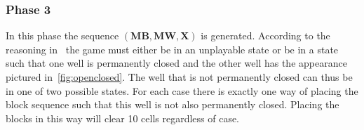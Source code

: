 \subsubsection{Phase 3}
\label{phase3}

In this phase the sequence $\left( \mathbf{MB}, \mathbf{MW}, \mathbf{X} \right)$ is generated. According to the reasoning in~ the game must either be in an unplayable state or be in a state such that one well is permanently closed and the other well has the appearance pictured in~\autoref{fig:openclosed}. The well that is not permanently closed can thus be in one of two possible states. For each case there is exactly one way of placing the block sequence such that this well is not also permanently closed. Placing the blocks in this way will clear 10 cells regardless of case.


